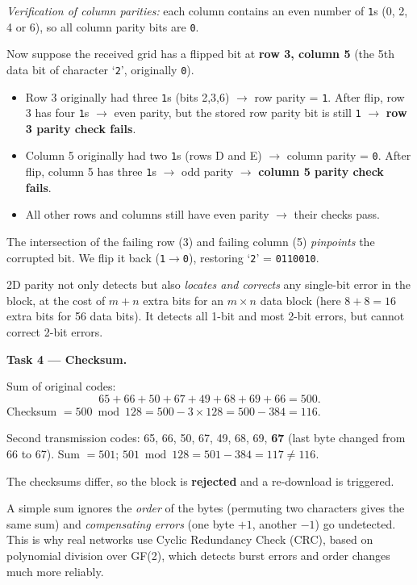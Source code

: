 \documentclass[11pt]{article}
\newcommand{\cle}[1]{{\popxbold\color{popdark}#1}}
\begin{document}
\emph{Verification of column parities:} each column contains an even number of \texttt{1}s (0, 2, 4 or 6), so all column parity bits are \texttt{0}.

Now suppose the received grid has a flipped bit at \textbf{row 3, column 5} (the 5th data bit of character `\texttt{2}', originally \texttt{0}). 

\begin{itemize}
\item Row 3 originally had three \texttt{1}s (bits 2,3,6) $\rightarrow$ row parity = \texttt{1}. After flip, row 3 has four \texttt{1}s $\rightarrow$ even parity, but the stored row parity bit is still \texttt{1} $\rightarrow$ \textbf{row 3 parity check fails}.
\item Column 5 originally had two \texttt{1}s (rows D and E) $\rightarrow$ column parity = \texttt{0}. After flip, column 5 has three \texttt{1}s $\rightarrow$ odd parity $\rightarrow$ \textbf{column 5 parity check fails}.
\item All other rows and columns still have even parity $\rightarrow$ their checks pass.
\end{itemize}

The intersection of the failing row (3) and failing column (5) \emph{pinpoints} the corrupted bit. We flip it back (\texttt{1}$\to$\texttt{0}), restoring `\texttt{2}' = \texttt{0110010}.

\begin{propriete}
2D parity not only detects but also \emph{locates and corrects} any single-bit error in the block, at the cost of $m+n$ extra bits for an $m\times n$ data block (here $8+8=16$ extra bits for 56 data bits). It detects all 1-bit and most 2-bit errors, but cannot correct 2-bit errors.
\end{propriete}

\textbf{Task 4 --- Checksum.}

Sum of original codes:
\[
65+66+50+67+49+68+69+66 = 500.
\]
Checksum $= 500 \bmod 128 = 500 - 3\times128 = 500-384 = \boxed{116}$.

Second transmission codes: 65, 66, 50, 67, 49, 68, 69, \textbf{67} (last byte changed from 66 to 67).
Sum $= 501$; $501 \bmod 128 = 501-384 = 117 \neq 116$.

The checksums differ, so the block is \textbf{rejected} and a re-download is triggered.

\begin{attention}
A simple sum ignores the \emph{order} of the bytes (permuting two characters gives the same sum) and \emph{compensating errors} (one byte $+1$, another $-1$) go undetected. This is why real networks use \cle{Cyclic Redundancy Check (CRC)}, based on polynomial division over GF(2), which detects burst errors and order changes much more reliably.
\end{attention}
\end{document}
